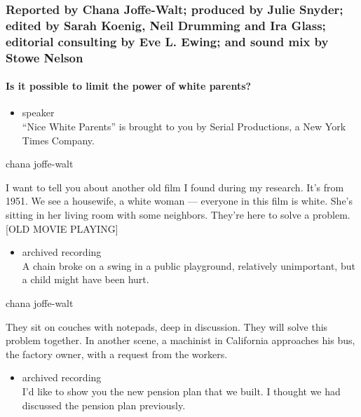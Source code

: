 \hypertarget{reported-by-chana-joffe-walt-produced-by-julie-snyder-edited-by-sarah-koenig-neil-drumming-and-ira-glass-editorial-consulting-by-eve-l-ewing-and-sound-mix-by-stowe-nelson}{%
\subsubsection{Reported by Chana Joffe-Walt; produced by Julie Snyder;
edited by Sarah Koenig, Neil Drumming and Ira Glass; editorial
consulting by Eve L. Ewing; and sound mix by Stowe
Nelson}\label{reported-by-chana-joffe-walt-produced-by-julie-snyder-edited-by-sarah-koenig-neil-drumming-and-ira-glass-editorial-consulting-by-eve-l-ewing-and-sound-mix-by-stowe-nelson}}

\hypertarget{is-it-possible-to-limit-the-power-of-white-parents}{%
\paragraph{Is it possible to limit the power of white
parents?}\label{is-it-possible-to-limit-the-power-of-white-parents}}

\begin{itemize}
\tightlist
\item
  speaker\\
  ``Nice White Parents'' is brought to you by Serial Productions, a New
  York Times Company.
\end{itemize}

chana joffe-walt

I want to tell you about another old film I found during my research.
It's from 1951. We see a housewife, a white woman --- everyone in this
film is white. She's sitting in her living room with some neighbors.
They're here to solve a problem. {[}OLD MOVIE PLAYING{]}

\begin{itemize}
\tightlist
\item
  archived recording\\
  A chain broke on a swing in a public playground, relatively
  unimportant, but a child might have been hurt.
\end{itemize}

chana joffe-walt

They sit on couches with notepads, deep in discussion. They will solve
this problem together. In another scene, a machinist in California
approaches his bus, the factory owner, with a request from the workers.

\begin{itemize}
\tightlist
\item
  archived recording\\
  I'd like to show you the new pension plan that we built. I thought we
  had discussed the pension plan previously.
\end{itemize}

